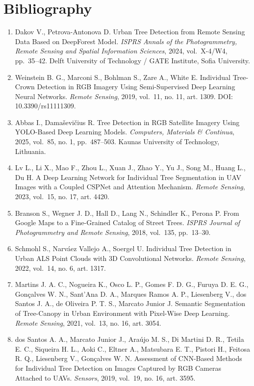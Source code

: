 \chapter*{Bibliography}

\begin{enumerate}
\def\labelenumi{[\arabic{enumi}]}
\item
  Dakov V., Petrova-Antonova D. Urban Tree Detection from Remote Sensing Data Based on DeepForest Model. \emph{ISPRS Annals of the Photogrammetry, Remote Sensing and Spatial Information Sciences}, 2024, vol.~X-4/W4, pp.~35--42. Delft University of Technology / GATE Institute, Sofia University.
\item
  Weinstein B. G., Marconi S., Bohlman S., Zare A., White E. Individual Tree-Crown Detection in RGB Imagery Using Semi-Supervised Deep Learning Neural Networks. \emph{Remote Sensing}, 2019, vol.~11, no. 11, art. 1309. DOI: 10.3390/rs11111309.
\item
  Abbas I., Damaševičius R. Tree Detection in RGB Satellite Imagery Using YOLO-Based Deep Learning Models. \emph{Computers, Materials \& Continua}, 2025, vol.~85, no. 1, pp.~487--503. Kaunas University of Technology, Lithuania.
\item
  Lv L., Li X., Mao F., Zhou L., Xuan J., Zhao Y., Yu J., Song M., Huang L., Du H. A Deep Learning Network for Individual Tree Segmentation in UAV Images with a Coupled CSPNet and Attention Mechanism. \emph{Remote Sensing}, 2023, vol.~15, no. 17, art. 4420.
\item
  Branson S., Wegner J. D., Hall D., Lang N., Schindler K., Perona P. From Google Maps to a Fine-Grained Catalog of Street Trees. \emph{ISPRS Journal of Photogrammetry and Remote Sensing}, 2018, vol.~135, pp.~13--30.
\item
  Schmohl S., Narváez Vallejo A., Soergel U. Individual Tree Detection in Urban ALS Point Clouds with 3D Convolutional Networks. \emph{Remote Sensing}, 2022, vol.~14, no. 6, art. 1317.
\item
  Martins J. A. C., Nogueira K., Osco L. P., Gomes F. D. G., Furuya D. E. G., Gonçalves W. N., Sant'Ana D. A., Marques Ramos A. P., Liesenberg V., dos Santos J. A., de Oliveira P. T. S., Marcato Junior J. Semantic Segmentation of Tree-Canopy in Urban Environment with Pixel-Wise Deep Learning. \emph{Remote Sensing}, 2021, vol.~13, no. 16, art. 3054.
\item
  dos Santos A. A., Marcato Junior J., Araújo M. S., Di Martini D. R., Tetila E. C., Siqueira H. L., Aoki C., Eltner A., Matsubara E. T., Pistori H., Feitosa R. Q., Liesenberg V., Gonçalves W. N. Assessment of CNN-Based Methods for Individual Tree Detection on Images Captured by RGB Cameras Attached to UAVs. \emph{Sensors}, 2019, vol.~19, no. 16, art. 3595.

\end{enumerate}

